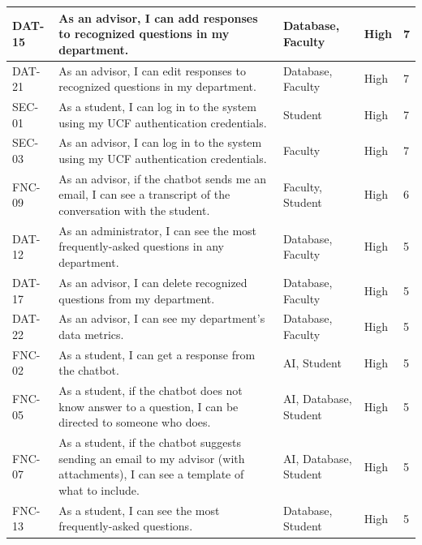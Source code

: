 \documentclass[titlepage, 12pt]{article}
\begin{document}
\begin{center}
\begin{longtable}{ L{1.5cm} L{4cm} L{3cm} L{1.5cm} L{1.5cm} }
\midrule
DAT-15 & As an advisor, I can add responses to recognized questions in my department.                                                      & Database, Faculty     & High   & 7  \\
\midrule
DAT-21 & As an advisor, I can edit responses to recognized questions in my department.                                                     & Database, Faculty     & High   & 7  \\
\midrule
SEC-01 & As a student, I can log in to the system using my UCF authentication credentials.                                                 & Student               & High   &
7  \\
\midrule
SEC-03 & As an advisor, I can log in to the system using my UCF authentication credentials.                                                & Faculty               & High   & 7  \\
\midrule
FNC-09 & As an advisor, if the chatbot sends me an email, I can see a transcript of the conversation with the student.                     & Faculty, Student      & High   & 6  \\
\midrule
DAT-12 & As an administrator, I can see the most frequently-asked questions in any department.                                             & Database, Faculty     & High   & 5  \\
\midrule
DAT-17 & As an advisor, I can delete recognized questions from my department.                                                              & Database, Faculty     & High   & 5  \\
\midrule
DAT-22 & As an advisor, I can see my department's data metrics.                                                                            & Database, Faculty     & High   & 5  \\
\midrule
FNC-02 & As a student, I can get a response from the chatbot.                                                                              & AI, Student           & High   & 5  \\
\midrule
FNC-05 & As a student, if the chatbot does not know answer to a question, I can be directed to someone who does.                           & AI, Database, Student & High   & 5  \\
\midrule
FNC-07 & As a student, if the chatbot suggests sending an email to my advisor (with attachments), I can see a template of what to include. & AI, Database, Student & High   & 5  \\
\midrule
FNC-13 & As a student, I can see the most frequently-asked questions.                                                                      & Database, Student     & High   & 5  \\

\end{longtable}
\end{center}
\end{document}
